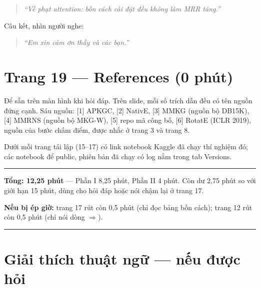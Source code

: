 \documentclass[11pt,a4paper]{article}
\begin{document}
\begin{quote}\itshape ``Về phạt attention: bốn cách cài đặt đều không làm MRR tăng.''\end{quote}

Câu kết, nhìn người nghe:


\begin{quote}\itshape ``Em xin cảm ơn thầy và các bạn.''\end{quote}

\section*{Trang 19 --- References (0 phút)}

Để sẵn trên màn hình khi hỏi đáp. Trên slide, mỗi số trích dẫn đều có tên nguồn đứng cạnh. Sáu nguồn: [1] APKGC, [2] NativE, [3] MMKG (nguồn bộ DB15K), [4] MMRNS (nguồn bộ MKG-W), [5] repo mã công bố, [6] RotatE (ICLR 2019), nguồn của bước chấm điểm, được nhắc ở trang 3 và trang 8.


Dưới mỗi trang tái lập (15--17) có link notebook Kaggle đã chạy thí nghiệm đó; các notebook để public, phiên bản đã chạy có log nằm trong tab Versions.


\medskip\noindent\rule{\linewidth}{0.3pt}\medskip

\textbf{Tổng: 12,25 phút} --- Phần I 8,25 phút, Phần II 4 phút. Còn dư 2,75 phút so với giới hạn 15 phút, dùng cho hỏi đáp hoặc nói chậm lại ở trang 17.


\textbf{Nếu bị ép giờ:} trang 17 rút còn 0,5 phút (chỉ đọc bảng bốn cách); trang 12 rút còn 0,5 phút (chỉ nói dòng \ensuremath{\Rightarrow}).


\medskip\noindent\rule{\linewidth}{0.3pt}\medskip

\newpage
\section*{Giải thích thuật ngữ --- nếu được hỏi}
\end{document}
